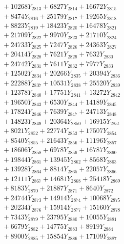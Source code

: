 \documentclass[a4paper,10pt]{article}
\begin{document}
{\begin{align}
&\;  + 10268 Y_{2813} + 6827 Y_{2814} + 16672 Y_{2815} \\[0.3ex]
&\;  + 8474 Y_{2816} + 25179 Y_{2817} + 19265 Y_{2818} \\[0.5ex]\allowbreak
&\;  + 8823 Y_{2819} + 18423 Y_{2820} + 16478 Y_{2821} \\[0.3ex]
&\;  + 21709 Y_{2822} + 9970 Y_{2823} + 21710 Y_{2824} \\[0.3ex]
&\;  + 24733 Y_{2825} + 7247 Y_{2826} + 24363 Y_{2827} \\[0.3ex]
&\;  + 20414 Y_{2828} + 7621 Y_{2829} + 7632 Y_{2830} \\[0.3ex]
&\;  + 24742 Y_{2831} + 7611 Y_{2832} + 7977 Y_{2833} \\[0.3ex]
&\;  + 12502 Y_{2834} + 20266 Y_{2835} + 20394 Y_{2836} \\[0.3ex]
&\;  + 22288 Y_{2837} + 10531 Y_{2838} + 25520 Y_{2839} \\[0.3ex]
&\;  + 12378 Y_{2840} + 17751 Y_{2841} + 13272 Y_{2842} \\[0.3ex]
&\;  + 19650 Y_{2843} + 6530 Y_{2844} + 14189 Y_{2845} \\[0.3ex]
&\;  + 17824 Y_{2846} + 7639 Y_{2847} + 24713 Y_{2848} \\[0.5ex]\allowbreak
&\;  + 14823 Y_{2849} + 20364 Y_{2850} + 16915 Y_{2851} \\[0.3ex]
&\;  + 8021 Y_{2852} + 22774 Y_{2853} + 17507 Y_{2854} \\[0.3ex]
&\;  + 8540 Y_{2855} + 21643 Y_{2856} + 11196 Y_{2857} \\[0.3ex]
&\;  + 18606 Y_{2858} + 6978 Y_{2859} + 16787 Y_{2860} \\[0.3ex]
&\;  + 19844 Y_{2861} + 13945 Y_{2862} + 8568 Y_{2863} \\[0.3ex]
&\;  + 13928 Y_{2864} + 8814 Y_{2865} + 22057 Y_{2866} \\[0.3ex]
&\;  + 12111 Y_{2867} + 14681 Y_{2868} + 25418 Y_{2869} \\[0.3ex]
&\;  + 8183 Y_{2870} + 21887 Y_{2871} + 8640 Y_{2872} \\[0.3ex]
&\;  + 24744 Y_{2873} + 14914 Y_{2874} + 10068 Y_{2875} \\[0.3ex]
&\;  + 20234 Y_{2876} + 15914 Y_{2877} + 15160 Y_{2878} \\[0.5ex]\allowbreak
&\;  + 7343 Y_{2879} + 23795 Y_{2880} + 10055 Y_{2881} \\[0.3ex]
&\;  + 6679 Y_{2882} + 14775 Y_{2883} + 8919 Y_{2884} \\[0.3ex]
&\;  + 8900 Y_{2885} + 15854 Y_{2886} + 17109 Y_{2887} \\[0.3ex]

\end{align}}
\end{document}

